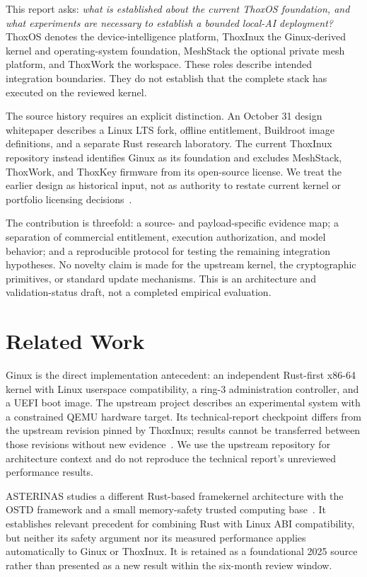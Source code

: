 \documentclass[11pt,a4paper]{article}
\begin{document}
This report asks: \emph{what is established about the current ThoxOS foundation, and what experiments are necessary to establish a bounded local-AI deployment?} ThoxOS denotes the device-intelligence platform, ThoxInux the Ginux-derived kernel and operating-system foundation, MeshStack the optional private mesh platform, and ThoxWork the workspace. These roles describe intended integration boundaries. They do not establish that the complete stack has executed on the reviewed kernel.

The source history requires an explicit distinction. An October 31 design whitepaper describes a Linux LTS fork, offline entitlement, Buildroot image definitions, and a separate Rust research laboratory. The current ThoxInux repository instead identifies Ginux as its foundation and excludes MeshStack, ThoxWork, and ThoxKey firmware from its open-source license. We treat the earlier design as historical input, not as authority to restate current kernel or portfolio licensing decisions~\cite{historical,thoxinux,rights}.

The contribution is threefold: a source- and payload-specific evidence map; a separation of commercial entitlement, execution authorization, and model behavior; and a reproducible protocol for testing the remaining integration hypotheses. No novelty claim is made for the upstream kernel, the cryptographic primitives, or standard update mechanisms. This is an architecture and validation-status draft, not a completed empirical evaluation.

\section{Related Work}
Ginux is the direct implementation antecedent: an independent Rust-first x86-64 kernel with Linux userspace compatibility, a ring-3 administration controller, and a UEFI boot image. The upstream project describes an experimental system with a constrained QEMU hardware target. Its technical-report checkpoint differs from the upstream revision pinned by ThoxInux; results cannot be transferred between those revisions without new evidence~\cite{ginux,upstream}. We use the upstream repository for architecture context and do not reproduce the technical report's unreviewed performance results.

ASTERINAS studies a different Rust-based framekernel architecture with the OSTD framework and a small memory-safety trusted computing base~\cite{asterinas}. It establishes relevant precedent for combining Rust with Linux ABI compatibility, but neither its safety argument nor its measured performance applies automatically to Ginux or ThoxInux. It is retained as a foundational 2025 source rather than presented as a new result within the six-month review window.
\end{document}
